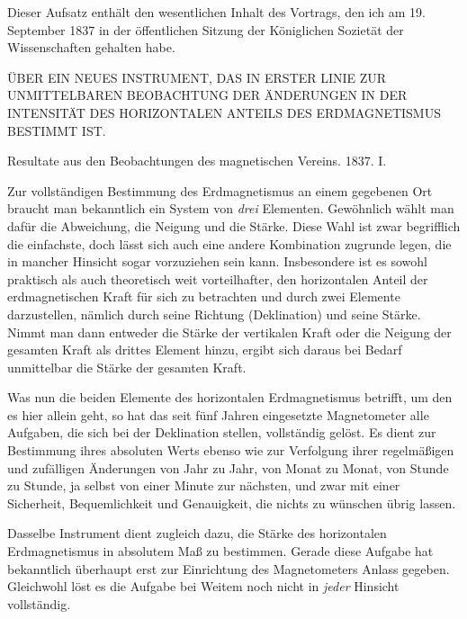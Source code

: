 \expandafter\def\csname HistoricalNoteText363\endcsname{Dieser Aufsatz enthält den wesentlichen Inhalt des Vortrags, den ich am 19. September 1837 in der öffentlichen Sitzung der Königlichen Sozietät der Wissenschaften gehalten habe.}
\clearpage
{}
\begin{center}
{\large ÜBER EIN NEUES INSTRUMENT, DAS IN ERSTER LINIE ZUR UNMITTELBAREN BEOBACHTUNG DER ÄNDERUNGEN IN DER INTENSITÄT DES HORIZONTALEN ANTEILS DES ERDMAGNETISMUS BESTIMMT IST.}
\par\medskip
Resultate aus den Beobachtungen des magnetischen Vereins. 1837. I.
\end{center}

Zur vollständigen Bestimmung des Erdmagnetismus an einem gegebenen Ort braucht man bekanntlich ein System von \textit{drei} Elementen. Gewöhnlich wählt man dafür die Abweichung, die Neigung und die Stärke. Diese Wahl ist zwar begrifflich die einfachste, doch lässt sich auch eine andere Kombination zugrunde legen, die in mancher Hinsicht sogar vorzuziehen sein kann. Insbesondere ist es sowohl praktisch als auch theoretisch weit vorteilhafter, den horizontalen Anteil der erdmagnetischen Kraft für sich zu betrachten und durch zwei Elemente darzustellen, nämlich durch seine Richtung (Deklination) und seine Stärke. Nimmt man dann entweder die Stärke der vertikalen Kraft oder die Neigung der gesamten Kraft als drittes Element hinzu, ergibt sich daraus bei Bedarf unmittelbar die Stärke der gesamten Kraft.

Was nun die beiden Elemente des horizontalen Erdmagnetismus betrifft, um den es hier allein geht, so hat das seit fünf Jahren eingesetzte Magnetometer alle Aufgaben, die sich bei der Deklination stellen, vollständig gelöst. Es dient zur Bestimmung ihres absoluten Werts ebenso wie zur Verfolgung ihrer regelmäßigen und zufälligen Änderungen von Jahr zu Jahr, von Monat zu Monat, von Stunde zu Stunde, ja selbst von einer Minute zur nächsten, und zwar mit einer Sicherheit, Bequemlichkeit und Genauigkeit, die nichts zu wünschen übrig lassen.

Dasselbe Instrument dient zugleich dazu, die Stärke des horizontalen Erdmagnetismus in absolutem Maß zu bestimmen. Gerade diese Aufgabe hat bekanntlich überhaupt erst zur Einrichtung des Magnetometers Anlass gegeben. Gleichwohl löst es die Aufgabe bei Weitem noch nicht in \textit{jeder} Hinsicht vollständig.

